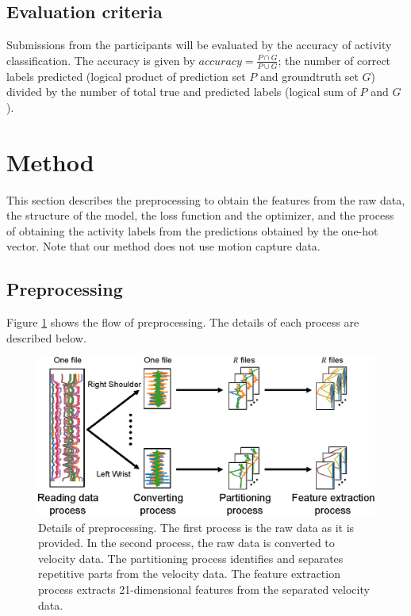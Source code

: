 \documentclass[graybox]{svmult}
\begin{document}
\subsection{Evaluation criteria}
Submissions from the participants will be evaluated by the accuracy of activity classification. The accuracy is given by $accuracy = \frac{P\cap G}{P\cup G}$; the number of correct labels predicted (logical product of prediction set $P$ and groundtruth set $G$) divided by the number of total true and predicted labels (logical sum of $P$ and $G$).

\section{Method}
\label{sec:method}
This section describes the preprocessing to obtain the features from the raw data, the structure of the model, the loss function and the optimizer, and the process of obtaining the activity labels from the predictions obtained by the one-hot vector. Note that our method does not use motion capture data.


\subsection{Preprocessing}
Figure \ref{fig:preprocess} shows the flow of preprocessing. The details of each process are described below.

\begin{figure}[h]
    \centering
    \includegraphics[width=0.7\linewidth]{figures/preprocess.eps}
    \caption{Details of preprocessing. The first process is the raw data as it is provided. In the second process, the raw data is converted to velocity data. The partitioning process identifies and separates repetitive parts from the velocity data. The feature extraction process extracts 21-dimensional features from the separated velocity data.}
    \label{fig:preprocess}
\end{figure}
\end{document}

